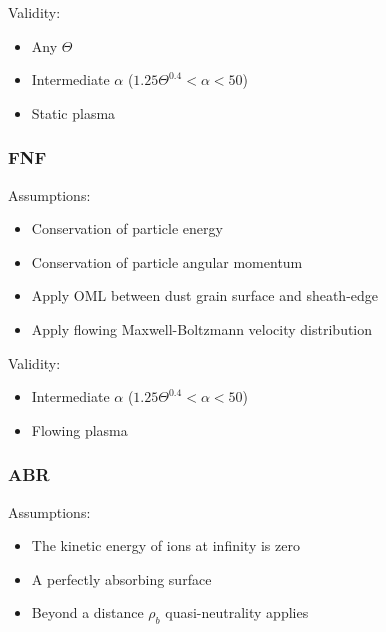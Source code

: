 \documentclass[journal]{Imperial_lab_report}
\begin{document}
\medskip

Validity:

\medskip

\begin{itemize}
\item Any $\Theta$
\item Intermediate $\alpha$ ($1.25\Theta^{0.4} < \alpha < 50$)
\item Static plasma
\end{itemize}

\medskip

\subsubsection{FNF}

\medskip

Assumptions:

\medskip

\begin{itemize}
\item Conservation of particle energy
\item Conservation of particle angular momentum
\item Apply OML between dust grain surface and sheath-edge
\item Apply flowing Maxwell-Boltzmann velocity distribution 
\end{itemize}

\medskip

Validity:

\medskip

\begin{itemize}
\item Intermediate $\alpha$ ($1.25\Theta^{0.4} < \alpha <50$)
\item Flowing plasma 
\end{itemize}

\medskip

\subsubsection{ABR}

\medskip

Assumptions:

\medskip

\begin{itemize}
\item The kinetic energy of ions at infinity is zero
\item A perfectly absorbing surface
\item Beyond a distance $\rho_b$ quasi-neutrality applies
\end{itemize}
\end{document}
